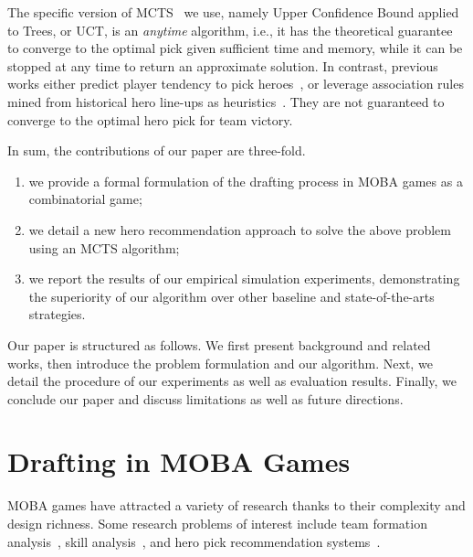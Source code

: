 The specific version of MCTS~\cite{kocsis2006bandit} we use, namely Upper Confidence Bound applied to Trees, or UCT, is an \textit{anytime} algorithm, i.e., it has the theoretical guarantee to converge to the optimal pick given sufficient time and memory, while it can be stopped at any time to return an approximate solution. In contrast, previous works either predict player tendency to pick heroes~\cite{summerville2017reco}, or leverage association rules mined from historical hero line-ups as heuristics~\cite{hanke2017reco}. They are not guaranteed to converge to the optimal hero pick for team victory.




In sum, the contributions of our paper are three-fold.
\begin{enumerate}
\item we provide a formal formulation of the drafting process in MOBA games as a combinatorial game;
\item we detail a new hero recommendation approach to solve the above problem using an MCTS algorithm;
\item we report the results of our empirical simulation experiments, demonstrating the superiority of our algorithm over other baseline and state-of-the-arts strategies.
\end{enumerate}

Our paper is structured as follows. We first present background and related works, then introduce the problem formulation and our algorithm. Next, we detail the procedure of our experiments as well as evaluation results. Finally, we conclude our paper and discuss limitations as well as future directions.

\section{Drafting in MOBA Games}
MOBA games have attracted a variety of research thanks to their complexity and design richness. Some research problems of interest include team formation analysis~\cite{pobie1,pobie2,neidhardt2015team,kim2016proficiency}, skill analysis~\cite{zhengxing2016player,Drachen:skill}, and hero pick recommendation systems~\cite{summerville2017reco,hanke2017reco}. 

